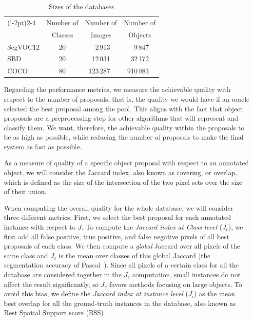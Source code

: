 \documentclass[10pt,journal,cspaper,compsoc]{IEEEtran}
\begin{document}
\begin{table}[h]
\centering
\begin{tabular}{l|ccc}
\cmidrule[\heavyrulewidth](l{-2pt}){2-4}
\multicolumn{1}{c}{}    & Number of  & Number of  & Number of  \\
\multicolumn{1}{c}{}    & Classes    &  Images    & Objects    \\
    \midrule
SegVOC12             &    20 &  \,\,\,2\,913  &   \,\,\,9\,847        \\
SBD                  &    20 &  12\,031  &  32\,172   \\
COCO                 &    80 &  123\,287\,\,\,  &    910\,983\,\,\,   \\
 \bottomrule
\end{tabular}
\vspace{1mm}
\caption{Sizes of the databases}
\label{tab:dbs}
\end{table}

Regarding the performance metrics, we measure the achievable quality with respect to the number of proposals, that is,
the quality we would have if an oracle selected the best proposal among the pool.
This aligns with the fact that object proposals are a preprocessing step for other algorithms that will represent and classify them.
We want, therefore, the achievable quality within the proposals to be as high as possible, while reducing the number of proposals to make the
final system as fast as possible.

As a measure of quality of a specific object proposal with respect to an annotated object, we will consider the Jaccard index,
also known as covering, or overlap, which is defined as the size of the intersection of the two pixel sets over the size of their union.

When computing the overall quality for the whole database, we will consider three different metrics.
First, we select the best proposal for each annotated instance with respect to $J$.
To compute the \textit{Jaccard index at Class level} ($J_c$), we first add all false
positive, true positive, and false negative pixels of all best proposals of each class.
We then compute a \textit{global} Jaccard over all pixels of the same class and
$J_c$ is the mean over classes of this global Jaccard (the segmentation accuracy of Pascal~\cite{Everingham2012}).
Since all pixels of a certain class for all the database are considered together in the $J_c$ computation, 
small instances do not affect the result significantly, so $J_c$ favors methods focusing on large objects.
To avoid this bias, we define the \textit{Jaccard index at instance level} ($J_i$) as the mean best overlap for all the ground-truth instances in the database,
also known as Best Spatial Support score (BSS)~\cite{Malisiewicz2007}.
\end{document}

